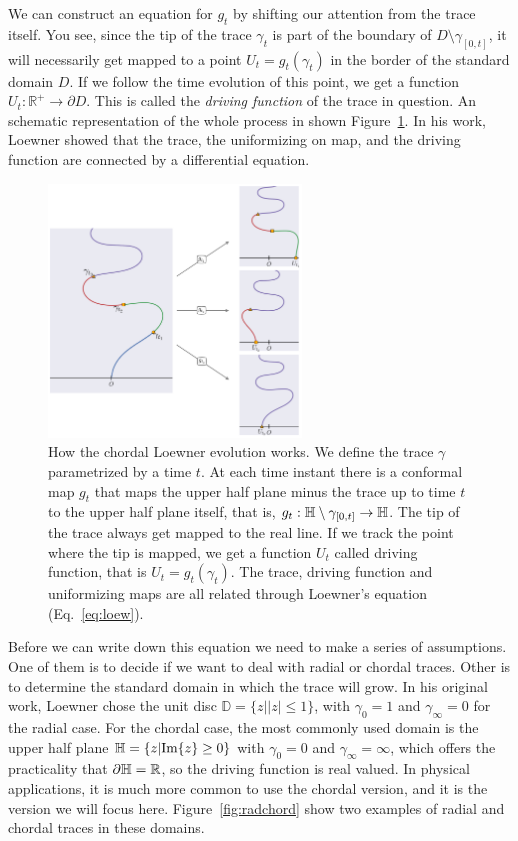 We can construct an equation for $g_t$ by shifting our attention from the trace
itself. You see, since the tip of the trace $\gamma_t$ is part of the boundary
of $D\setminus\gamma_{[0,t]}$, it will necessarily get mapped to a point
$U_t=g_t(\gamma_t)$ in the border of the standard domain $D$. If we follow the
time evolution of this point, we get a function
$U_t:\mathbb{R}^+\rightarrow\partial D$. This is called the \textit{driving
    function} of the trace in question. An schematic representation of the
whole process in shown Figure~\ref{fig:loewexplain}. In his work, Loewner
showed that the trace, the uniformizing on map, and the driving function are
connected by a differential equation.

\begin{figure}[t]
\begin{center}
    \includegraphics[width=0.6\textwidth]{chapters/ch4-sle/figs/loewexplain}
\end{center}
\caption{How the chordal Loewner evolution works. We define the trace $\gamma$
    parametrized by a time $t$. At each time instant there is a conformal map
    $g_t$ that maps the upper half plane minus the trace up to time $t$ to the
    upper half plane itself, that is, $g_t:\mathbb{H}\setminus\gamma_{[0,t]}
    \rightarrow\mathbb{H}$. The tip of the trace always get mapped to the real line.
    If we track the point where the tip is mapped, we get a function $U_t$
    called driving function, that is $U_t=g_t\left(\gamma_t\right)$.
    The trace, driving function and uniformizing maps are all related through
    Loewner's equation (Eq.~\ref{eq:loew}).}
\label{fig:loewexplain}
\end{figure}

Before we can write down this equation we need to make a series of assumptions.
One of them is to decide if we want to deal with radial or chordal traces.
Other is to determine the standard domain in which the trace will grow. In his
original work, Loewner chose the unit disc $\mathbb{D}=\{z||z|\leq1\}$, with
$\gamma_0=1$ and $\gamma_\infty=0$ for the radial case. For the chordal case,
the most commonly used domain is the upper half plane
$\mathbb{H}=\{z|\mbox{Im}\{z\}\geq0\}$ with $\gamma_0=0$ and $\gamma_\infty=\infty$,
which offers the practicality that $\partial\mathbb{H}=\mathbb{R}$, so the driving
function is real valued. In physical applications, it is much more common to
use the chordal version, and it is the version we will focus here.
Figure~\ref{fig:radchord} show two examples of radial and chordal traces in
these domains.

